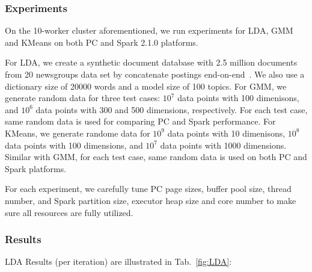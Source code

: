 \subsubsection {Experiments}

On the 10-worker cluster aforementioned, we run experiments for LDA,
GMM and KMeans on both PC and Spark 2.1.0 platforms. 

For LDA,  we
create a synthetic document database with 2.5 million documents from
20 newsgroups data set by concatenate postings
end-on-end~\cite{jermaineExperimental}. We also use a dictionary size
of 20000 words and a model size of 100 topics. For GMM, we generate
random data for three test cases: $10^7$ data
points with 100 dimenisons, and $10^6$ data points with 300 and 500
dimensions, respectively. For each test case, same random data is used
for comparing PC and Spark performance. For KMeans, we
generate randome data for $10^9$ data
points with 10 dimenisons, $10^8$ data points with 100 dimensions,  and $10^7$
data points with 1000
dimensions. Similar with GMM, for each test case, same random data is used on both PC and
Spark platforms.

For each experiment, we carefully tune PC page sizes, buffer pool
size, thread number, and Spark
partition size, executor heap size and core number to make sure all
resources are fully utilized.




\subsubsection {Results}

LDA Results (per iteration) are illustrated in Tab.~\ref{fig:LDA}:

